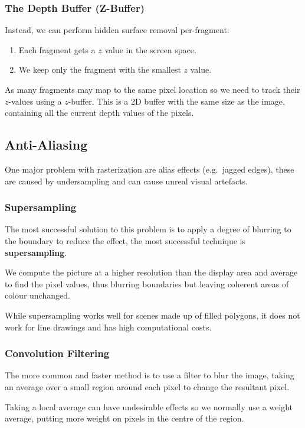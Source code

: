\documentclass[11pt]{article}
\begin{document}
\subsubsection{The Depth Buffer (Z-Buffer)}
Instead, we can perform hidden surface removal per-fragment:
\begin{enumerate}
  \item Each fragment gets a $z$ value in the screen space.
  \item We keep only the fragment with the smallest $z$ value.
\end{enumerate}
As many fragments may map to the same pixel location so we need to track their $z$-values using a $z$-buffer.
This is a 2D buffer with the same size as the image, containing all the current depth values of the pixels.

\subsection{Anti-Aliasing}
One major problem with rasterization are alias effects (e.g.\ jagged edges), these are caused by undersampling and can cause unreal visual artefacts.


\subsubsection{Supersampling}
The most successful solution to this problem is to apply a degree of blurring to the boundary to reduce the effect, the most successful technique is \textbf{supersampling}.

We compute the picture at a higher resolution than the display area and average to find the pixel values, thus blurring boundaries but leaving coherent areas of colour unchanged.

While supersampling works well for scenes made up of filled polygons, it does not work for line drawings and has high computational costs.

\subsubsection{Convolution Filtering}
The more common and faster method is to use a filter to blur the image, taking an average over a small region around each pixel to change the resultant pixel.

Taking a local average can have undesirable effects so we normally use a weight average, putting more weight on pixels in the centre of the region.
\end{document}
